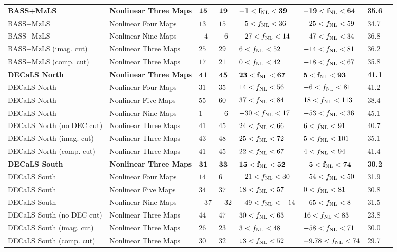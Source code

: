 \begin{table}
{\begin{tabular}{llllllll}
\hline
\bf{BASS+MzLS}                 & \bf{Nonlinear Three Maps}& $ \bf{15}$& $ \bf{19}$& $ \bf{-1<f_{\rm NL}< 39}$& $\bf{-19<f_{\rm NL}< 64}$ & \bf{35.6}\\
BASS+MzLS                 & Nonlinear Four Maps& $ 13$& $ 15$& $ -5<f_{\rm NL}< 36$& $-25<f_{\rm NL}< 59$ &   34.7\\
BASS+MzLS                 & Nonlinear Nine Maps& $ -4$& $ -6$& $-27<f_{\rm NL}< 14$& $-47<f_{\rm NL}< 34$ &   36.8\\
BASS+MzLS (imag. cut)     & Nonlinear Three Maps& $ 25$& $ 29$& $  6<f_{\rm NL}< 52$& $-14<f_{\rm NL}< 81$ &   36.2\\
BASS+MzLS (comp. cut)     & Nonlinear Three Maps& $ 17$& $ 21$& $  0<f_{\rm NL}< 42$& $-18<f_{\rm NL}< 67$ &   35.8\\
\bf{DECaLS North}              & \bf{Nonlinear Three Maps}& $ \bf{41}$& $ \bf{45}$& $ \bf{23<f_{\rm NL}< 67}$& $  \bf{5<f_{\rm NL}< 93}$ & \bf{41.1}\\
DECaLS North              & Nonlinear Four Maps& $ 31$& $ 35$& $ 14<f_{\rm NL}< 56$& $ -6<f_{\rm NL}< 81$ &   41.2\\
DECaLS North              & Nonlinear Five Maps& $ 55$& $ 60$& $ 37<f_{\rm NL}< 84$& $ 18<f_{\rm NL}<113$ &   38.4\\
DECaLS North              & Nonlinear Nine Maps& $  1$& $ -6$& $-30<f_{\rm NL}< 17$& $-53<f_{\rm NL}< 36$ &   45.1\\
DECaLS North (no DEC cut) & Nonlinear Three Maps& $ 41$& $ 45$& $ 24<f_{\rm NL}< 66$& $  6<f_{\rm NL}< 91$ &   40.7\\
DECaLS North (imag. cut)  & Nonlinear Three Maps& $ 43$& $ 48$& $ 25<f_{\rm NL}< 72$& $  5<f_{\rm NL}<101$ &   35.1\\
DECaLS North (comp. cut)  & Nonlinear Three Maps& $ 41$& $ 45$& $ 22<f_{\rm NL}< 67$& $  4<f_{\rm NL}< 94$ &   41.4\\
\bf{DECaLS South}              & \bf{Nonlinear Three Maps}& $ \bf{31}$& $ \bf{33}$& $ \bf{15<f_{\rm NL}< 52}$& $ \bf{-5<f_{\rm NL}< 74}$ &   \bf{30.2}\\
DECaLS South              & Nonlinear Four Maps& $ 14$& $  6$& $-21<f_{\rm NL}< 30$& $-54<f_{\rm NL}< 50$ &   31.9\\
DECaLS South              & Nonlinear Five Maps& $ 34$& $ 37$& $ 18<f_{\rm NL}< 57$& $ 0<f_{\rm NL}< 81$ &   30.8\\
DECaLS South              & Nonlinear Nine Maps& $-37$& $-32$& $-49<f_{\rm NL}<-14$& $-65<f_{\rm NL}<  8$ &   31.5\\
DECaLS South (no DEC cut) & Nonlinear Three Maps& $ 44$& $ 47$& $ 30<f_{\rm NL}< 63$& $ 16<f_{\rm NL}< 83$ &   23.8\\
DECaLS South (imag. cut)  & Nonlinear Three Maps& $ 26$& $ 23$& $  3<f_{\rm NL}< 48$& $-58<f_{\rm NL}< 71$ &   30.0\\
DECaLS South (comp. cut)  & Nonlinear Three Maps& $ 30$& $ 32$& $ 13<f_{\rm NL}< 52$& $ -9.78<f_{\rm NL}< 74$ &   29.7\\
   \hline
    \end{tabular}}
\end{table}
